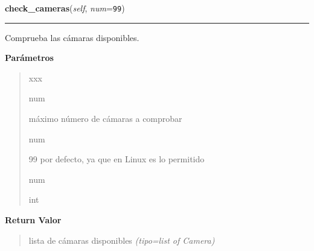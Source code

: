 \hspace{.8\funcindent}\begin{boxedminipage}{\funcwidth}

    \raggedright \textbf{check\_cameras}(\textit{self}, \textit{num}={\tt 99})

    \vspace{-1.5ex}

    \rule{\textwidth}{0.5\fboxrule}
\setlength{\parskip}{2ex}
Comprueba las cámaras disponibles.

\setlength{\parskip}{1ex}
      \textbf{Parámetros}
      \vspace{-1ex}

      \begin{quote}
        \begin{Ventry}{xxx}

          \item[num]


máximo número de cámaras a comprobar
          \item[num]


99 por defecto, ya que en Linux es lo permitido
          \item[num]


int
        \end{Ventry}

      \end{quote}

      \textbf{Return Valor}
    \vspace{-1ex}

      \begin{quote}

lista de cámaras disponibles
      {\it (tipo=list of Camera)}

      \end{quote}

    \end{boxedminipage}

    \label{src:cameras:Cameras:show_and_select_camera}

    \vspace{0.5ex}

